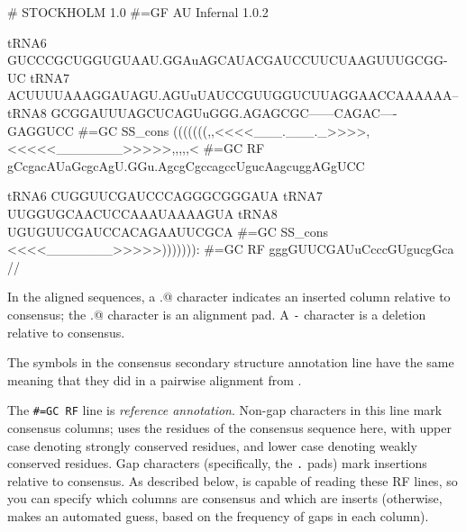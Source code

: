 {\samepage

\begin{sreoutput}
# STOCKHOLM 1.0
#=GF AU Infernal 1.0.2

tRNA6        GUCCCGCUGGUGUAAU.GGAuAGCAUACGAUCCUUCUAAGUUUGCGG-UC
tRNA7        ACUUUUAAAGGAUAGU.AGUuUAUCCGUUGGUCUUAGGAACCAAAAAA--
tRNA8        GCGGAUUUAGCUCAGUuGGG.AGAGCGC------CAGAC----GAGGUCC
#=GC SS_cons (((((((,,<<<<___.___._>>>>,<<<<<_______>>>>>,,,,,<
#=GC RF      gCcgacAUaGcgcAgU.GGu.AgcgCgccagccUgucAagcuggAGgUCC

tRNA6        CUGGUUCGAUCCCAGGGCGGGAUA
tRNA7        UUGGUGCAACUCCAAAUAAAAGUA
tRNA8        UGUGUUCGAUCCACAGAAUUCGCA
#=GC SS_cons <<<<_______>>>>>))))))):
#=GC RF      gggGUUCGAUuCcccGUgucgGca
//
\end{sreoutput}
}

In the aligned sequences, a \verb@.@ character indicates an inserted
column relative to consensus; the \verb@.@ character is an alignment
pad. A \verb+-+ character is a deletion relative to consensus.

The symbols in the consensus secondary structure annotation line have
the same meaning that they did in a pairwise alignment from
.

The {\small\verb+#=GC RF+} line is \emph{reference
annotation}. Non-gap characters in this line mark consensus columns;
 uses the residues of the consensus sequence here, with
upper case denoting strongly conserved residues, and lower case
denoting weakly conserved residues. Gap characters (specifically, the
\verb+.+ pads) mark insertions relative to consensus. As described
below,  is capable of reading these RF lines, so you can
specify which columns are consensus and which are inserts (otherwise,
 makes an automated guess, based on the frequency of
gaps in each column).

